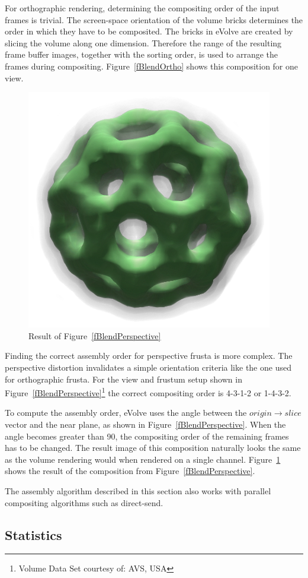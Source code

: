 \documentclass[10pt,a4]{scrartcl}
\newcommand{\fig}[1]{Figure~\ref{#1}}
\begin{document}
For orthographic rendering, determining the compositing order of the
input frames is trivial. The screen-space orientation of the volume
bricks determines the order in which they have to be composited. The
bricks in \textsf{eVolve} are created by slicing the volume along one
dimension. Therefore the range of the resulting frame buffer images,
together with the sorting order, is used to arrange the frames during
compositing. \fig{fBlendOrtho} shows this composition for one view.

\begin{figure}
  \includegraphics[width=.382\textwidth]{images/volResult.png}
  {\caption{\label{fVolResult}Result of \fig{fBlendPerspective}}}
\end{figure}
Finding the correct assembly order for perspective frusta is more
complex. The perspective distortion invalidates a simple orientation
criteria like the one used for orthographic frusta. For the view and
frustum setup shown in \fig{fBlendPerspective}\footnote{Volume Data Set
  courtesy of: AVS, USA} the correct compositing order is 4-3-1-2 or
1-4-3-2.

To compute the assembly order, \textsf{eVolve} uses the angle between
the $origin \rightarrow slice$ vector and the near plane, as shown in
\fig{fBlendPerspective}. When the angle becomes greater than
90\textdegree, the compositing order of the remaining frames has to be
changed. The result image of this composition naturally looks the same
as the volume rendering would when rendered on a single
channel. \fig{fVolResult} shows the result of the composition from
\fig{fBlendPerspective}.

The assembly algorithm described in this section also works with parallel
compositing algorithms such as direct-send. 


\subsection{\label{sStatistics}Statistics}
\end{document}
